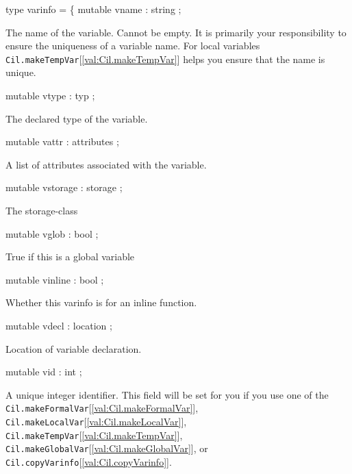 \documentclass[11pt]{article}
\begin{document}
\label{type:Cil.varinfo}\begin{ocamldoccode}
type varinfo = \{
  mutable vname : string ;
\end{ocamldoccode}
\begin{ocamldoccomment}
The name of the variable. Cannot be empty. It is primarily your 
 responsibility to ensure the uniqueness of a variable name. For local 
 variables {\tt{Cil.makeTempVar}}[\ref{val:Cil.makeTempVar}] helps you ensure that the name is unique.
\end{ocamldoccomment}
\begin{ocamldoccode}
  mutable vtype : typ ;
\end{ocamldoccode}
\begin{ocamldoccomment}
The declared type of the variable.
\end{ocamldoccomment}
\begin{ocamldoccode}
  mutable vattr : attributes ;
\end{ocamldoccode}
\begin{ocamldoccomment}
A list of attributes associated with the variable.
\end{ocamldoccomment}
\begin{ocamldoccode}
  mutable vstorage : storage ;
\end{ocamldoccode}
\begin{ocamldoccomment}
The storage-class
\end{ocamldoccomment}
\begin{ocamldoccode}
  mutable vglob : bool ;
\end{ocamldoccode}
\begin{ocamldoccomment}
True if this is a global variable
\end{ocamldoccomment}
\begin{ocamldoccode}
  mutable vinline : bool ;
\end{ocamldoccode}
\begin{ocamldoccomment}
Whether this varinfo is for an inline function.
\end{ocamldoccomment}
\begin{ocamldoccode}
  mutable vdecl : location ;
\end{ocamldoccode}
\begin{ocamldoccomment}
Location of variable declaration.
\end{ocamldoccomment}
\begin{ocamldoccode}
  mutable vid : int ;
\end{ocamldoccode}
\begin{ocamldoccomment}
A unique integer identifier. This field will be 
 set for you if you use one of the {\tt{Cil.makeFormalVar}}[\ref{val:Cil.makeFormalVar}], 
 {\tt{Cil.makeLocalVar}}[\ref{val:Cil.makeLocalVar}], {\tt{Cil.makeTempVar}}[\ref{val:Cil.makeTempVar}], {\tt{Cil.makeGlobalVar}}[\ref{val:Cil.makeGlobalVar}], or 
 {\tt{Cil.copyVarinfo}}[\ref{val:Cil.copyVarinfo}].
\end{ocamldoccomment}
\end{document}
